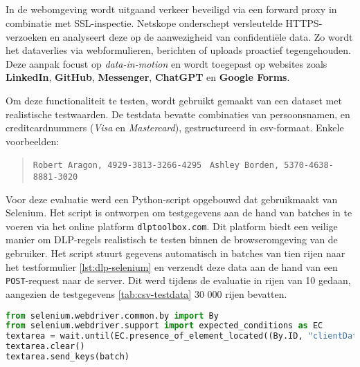 \subsection{}
\label{subsubsec:web-poc}

In de webomgeving wordt uitgaand verkeer beveiligd via een forward proxy in combinatie met SSL-inspectie. 
Netskope onderschept versleutelde HTTPS-verzoeken en analyseert deze op de aanwezigheid van confidentiële data.
Zo wordt het dataverlies via webformulieren, berichten of uploads proactief tegengehouden. 
Deze aanpak focust op \textit{data-in-motion} en wordt toegepast op websites zoals \textbf{LinkedIn}, \textbf{GitHub}, \textbf{Messenger}, \textbf{ChatGPT} en \textbf{Google Forms}.

Om deze functionaliteit te testen, wordt gebruikt gemaakt van een dataset met realistische testwaarden. 
De testdata bevatte combinaties van persoonsnamen, en creditcardnummers (\textit{Visa} en \textit{Mastercard}), gestructureerd in \gls{csv}-formaat. Enkele voorbeelden:

\begin{quote}\small
\texttt{Robert Aragon, 4929-3813-3266-4295} \
\texttt{Ashley Borden, 5370-4638-8881-3020}
\end{quote}

Voor deze evaluatie werd een Python-script opgebouwd dat gebruikmaakt van Selenium. 
Het script is ontworpen om testgegevens aan de hand van batches in te voeren via het online platform \texttt{dlptoolbox.com}.
Dit platform biedt een veilige manier om DLP-regels realistisch te testen binnen de browseromgeving van de gebruiker.
Het script stuurt gegevens automatisch in batches van tien rijen naar het testformulier \ref{lst:dlp-selenium} en verzendt deze data aan de hand van een \texttt{POST}-request naar de server.
Dit werd tijdens de evaluatie in rijen van 10 gedaan, aangezien de testgegevens \ref{tab:csv-testdata} 30 000 rijen bevatten.

{\small
\begin{lstlisting}[language=Python,caption={Versturen van batches via Selenium},label={lst:dlp-selenium}, captionpos=b, basicstyle=\small\ttfamily]
from selenium.webdriver.common.by import By
from selenium.webdriver.support import expected_conditions as EC
textarea = wait.until(EC.presence_of_element_located((By.ID, "clientDataClear")))
textarea.clear()
textarea.send_keys(batch)
\end{lstlisting}
}


